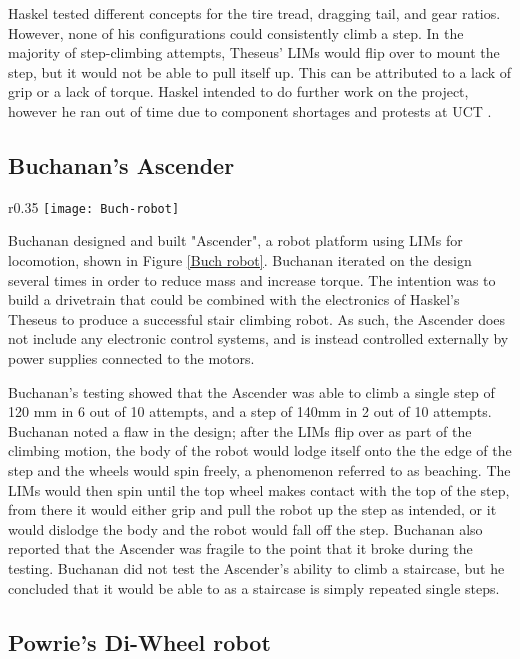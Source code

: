 Haskel tested different concepts for the tire tread, dragging tail, and gear ratios. However, none of his configurations could consistently climb a step. In the majority of step-climbing attempts, Theseus' LIMs would flip over to mount the step, but it would not be able to pull itself up. This can be attributed to a lack of grip or a lack of torque. Haskel intended to do further work on the project, however he ran out of time due to component shortages and protests at UCT \citep{Haskel-2017}.
\newpage
\subsection{Buchanan's Ascender} %

\begin{wrapfigure}{r}{0.35\textwidth}
	\centering
	\texttt{[image: Buch-robot]}
	\caption{Buchanan's Ascender \citep{Buchanan-2018}}
	\label{Buch robot}
\end{wrapfigure}
Buchanan designed and built "Ascender", a robot platform using LIMs for locomotion, shown in Figure \ref{Buch robot}. Buchanan iterated on the design several times in order to reduce mass and increase torque. The intention was to build a drivetrain that could be combined with the electronics of Haskel's Theseus to produce a successful stair climbing robot. As such, the Ascender does not include any electronic control systems, and is instead controlled externally by power supplies connected to the motors.

Buchanan's testing showed that the Ascender was able to climb a single step of 120 mm in 6 out of 10 attempts, and a step of 140mm in 2 out of 10 attempts. Buchanan noted a flaw in the design; after the LIMs flip over as part of the climbing motion, the body of the robot would lodge itself onto the the edge of the step and the wheels would spin freely, a phenomenon referred to as beaching. The LIMs would then spin until the top wheel makes contact with the top of the step, from there it would either grip and pull the robot up the step as intended, or it would dislodge the body and the robot would fall off the step. Buchanan also reported that the Ascender was fragile to the point that it broke during the testing. Buchanan did not test the Ascender's ability to climb a staircase, but he concluded that it would be able to as a staircase is simply repeated single steps. \citep{Buchanan-2018}

\subsection{Powrie's Di-Wheel robot}

